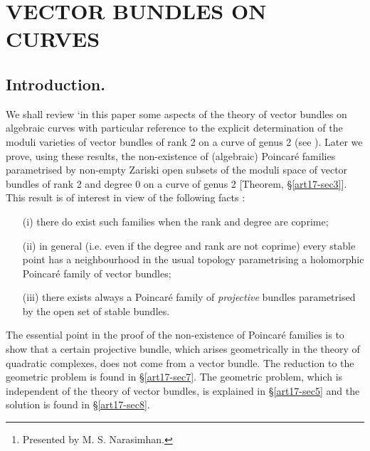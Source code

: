 \chapter[\textsc{M. S. Narasimhan} and \textsc{S. Ramanan~:} Vector Bundles on Curves]{VECTOR BUNDLES ON CURVES}\label{art17}

\begin{center}
\author{By~~ M. S. Narasimhan and S. Ramanan\footnote{Presented by M. S. Narasimhan.}}
\end{center}

\setcounter{pageoriginal}{334}
\section{Introduction.}\label{art17-sec1}
\pageoriginale


We shall review `in this paper some aspects of the theory of vector bundles on algebraic curves with particular reference to the explicit determination of the moduli varieties of vector bundles of rank 2 on a curve of genus 2 (see \cite{art17-key3}). Later we prove, using these results, the non-existence of (algebraic) Poincar\'e families parametrised by non-empty Zariski open subsets of the moduli space of vector bundles of rank 2 and degree 0 on a curve of genus 2 [Theorem, \S\ref{art17-sec3}]. This result is of interest in view of the following facts :
\begin{itemize}
\item[(i)] there do exist such families when the rank and degree are coprime;

\item[(ii)] in general (i.e. even if the degree and rank are not coprime) every stable point has a neighbourhood in the usual topology parametrising a holomorphic Poincar\'e family of vector bundles;

\item[(iii)] there exists always a Poincar\'e family of {\em projective} bundles para\-metrised by the open set of stable bundles.
\end{itemize}

The essential point in the proof of the non-existence of Poincar\'e families is to show that a certain projective bundle, which arises geometrically in the theory of quadratic complexes, does not come from a vector bundle. The reduction to the geometric problem is found in \S\ref{art17-sec7}. The geometric problem, which is independent of the theory of vector bundles, is explained in \S\ref{art17-sec5} and the solution is found in \S\ref{art17-sec8}.

